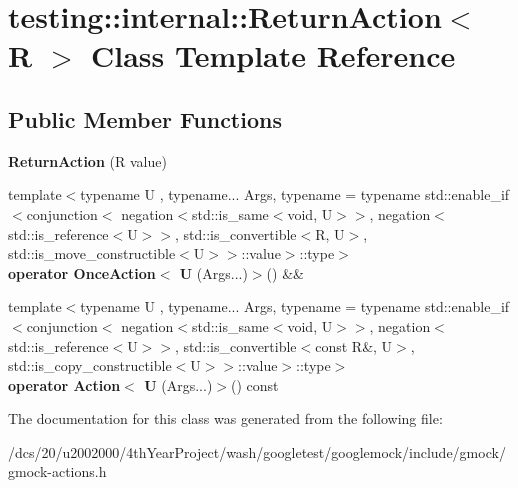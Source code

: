 \hypertarget{classtesting_1_1internal_1_1ReturnAction}{}\section{testing\+:\+:internal\+:\+:Return\+Action$<$ R $>$ Class Template Reference}
\label{classtesting_1_1internal_1_1ReturnAction}
\subsection*{Public Member Functions}
\begin{DoxyCompactItemize}
\item 
\mbox{\label{classtesting_1_1internal_1_1ReturnAction_af65344e503dae3ab36b4fd6d1ede6fb7}} 
{\bfseries Return\+Action} (R value)
\item 
\mbox{\label{classtesting_1_1internal_1_1ReturnAction_a4739a4229acb1b4b4a741853170a16d4}} 
{\footnotesize template$<$typename U , typename... Args, typename  = typename std\+::enable\+\_\+if$<$conjunction$<$                                negation$<$std\+::is\+\_\+same$<$void, U$>$$>$,                  negation$<$std\+::is\+\_\+reference$<$\+U$>$$>$,                   std\+::is\+\_\+convertible$<$\+R, U$>$,                        std\+::is\+\_\+move\+\_\+constructible$<$\+U$>$$>$\+::value$>$\+::type$>$ }\\{\bfseries operator Once\+Action$<$ U} (Args...)$>$() \&\&
\item 
\mbox{\label{classtesting_1_1internal_1_1ReturnAction_a9ece9726503ae107ff979396273593e6}} 
{\footnotesize template$<$typename U , typename... Args, typename  = typename std\+::enable\+\_\+if$<$conjunction$<$                                negation$<$std\+::is\+\_\+same$<$void, U$>$$>$,                   negation$<$std\+::is\+\_\+reference$<$\+U$>$$>$,                    std\+::is\+\_\+convertible$<$const R\&, U$>$,                  std\+::is\+\_\+copy\+\_\+constructible$<$\+U$>$$>$\+::value$>$\+::type$>$ }\\{\bfseries operator Action$<$ U} (Args...)$>$() const
\end{DoxyCompactItemize}


The documentation for this class was generated from the following file\+:\begin{DoxyCompactItemize}
\item 
/dcs/20/u2002000/4th\+Year\+Project/wash/googletest/googlemock/include/gmock/gmock-\/actions.\+h\end{DoxyCompactItemize}

